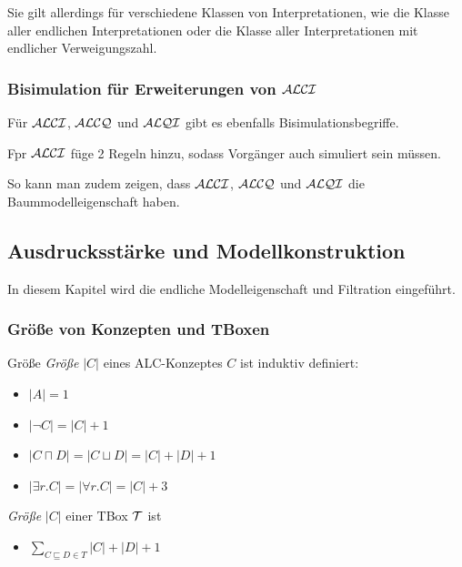 Sie gilt allerdings für verschiedene Klassen von Interpretationen, wie die Klasse aller endlichen Interpretationen oder die Klasse aller Interpretationen mit endlicher Verweigungszahl.

\subsubsection{Bisimulation für Erweiterungen von $\mathcal{A}\mathcal{L}\mathcal{C}\mathcal{I}$}\label{bisimulation-in-alci}

Für $\mathcal{A}\mathcal{L}\mathcal{C}\mathcal{I}$, $\mathcal{A}\mathcal{L}\mathcal{C}\mathcal{Q}$ und $\mathcal{A}\mathcal{L}\mathcal{Q}\mathcal{I}$ gibt es ebenfalls Bisimulationsbegriffe.

Fpr $\mathcal{A}\mathcal{L}\mathcal{C}\mathcal{I}$ füge 2 Regeln hinzu, sodass Vorgänger auch simuliert sein müssen.

So kann man zudem zeigen, dass $\mathcal{A}\mathcal{L}\mathcal{C}\mathcal{I}$, $\mathcal{A}\mathcal{L}\mathcal{C}\mathcal{Q}$ und $\mathcal{A}\mathcal{L}\mathcal{Q}\mathcal{I}$ die Baummodelleigenschaft haben.

\subsection{Ausdrucksstärke und
Modellkonstruktion}\label{ausdrucksstuxe4rke-und-modellkonstruktion}

In diesem Kapitel wird die endliche Modelleigenschaft und Filtration eingeführt.

\subsubsection{Größe von Konzepten und
TBoxen}\label{gruxf6uxdfe-von-konzepten-und-tboxen}

\begin{definition}{Größe}
\emph{Größe} $\left| C \right|$ eines ALC-Konzeptes $C$ ist induktiv
definiert:

\begin{itemize}
\item
  $\left| A \right| = 1$
\item
  $\left| \neg C \right| = \left| C \right| + 1$
\item
  $\left| C \sqcap D \right| = \left| C \sqcup D \right| = \left| C \right| + \left| D \right| + 1$
\item
  $\left| \exists r.C \right| = \left| \forall r.C \right| = \left| C \right| + 3$
\end{itemize}

\emph{Größe} $\left| C \right|$ einer TBox $\mathcal{T}$ ist

\begin{itemize}
\item
  $\sum_{C \sqsubseteq D \in T}^{}{\left| C \right| + \left| D \right| + 1}$
\end{itemize}
\end{definition}

